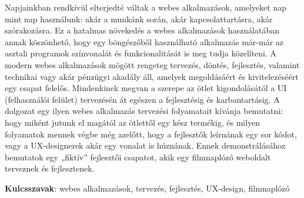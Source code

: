 Napjainkban rendkívül elterjedté váltak a webes alkalmazások, amelyeket nap mint nap használunk: akár a munkánk során, akár kapcsolattartásra, akár szórakozásra. Ez a hatalmas növekedés a webes alkalmazások használatában annak köszönhető, hogy egy böngészőből használható alkalmazás már-már az asztali programok színvonalát és funkcionalitását is meg tudja közelíteni.
A modern webes alkalmazások mögött rengeteg tervezés, döntés, fejlesztés, valamint technikai vagy akár pénzügyi akadály áll, amelyek megoldásáért és kivitelezéséért egy csapat felelős. Mindenkinek megvan a szerepe az ötlet kigondolásától a UI (felhasználói felület) tervezésén át egészen a fejlesztésig és karbantartásig.
A dolgozat egy ilyen webes alkalmazás tervezési folyamatait kívánja bemutatni: hogy miként jutunk el magától az ötlettől egy kész termékig, és milyen folyamatok mennek végbe még azelőtt, hogy a fejlesztők leírnának egy sor kódot, vagy a UX-designerek akár egy vonalat is húznának.
Ennek demonstrálásához bemutatok egy „fiktív” fejlesztői csapatot, akik egy filmnaplózó weboldalt terveznek és fejlesztenek.

\textbf{Kulcsszavak}: webes alkalmazások, tervezés, fejlesztés, UX-design, filmnaplózó